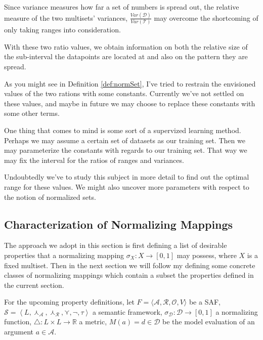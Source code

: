 \documentclass{article}
\newcommand{\real}{\mathbb{R}}  %
\newcommand{\args}{\mathcal{A}} %
\newcommand{\att}{\mathcal{R}}  %
\newcommand{\valueset}{L}
\newcommand{\obj}{\mathcal{O}} %
\newcommand{\safid}{F}               %
\newcommand{\safbodyO}{\langle \args, \att, \obj, V \rangle} %
\newcommand{\safO}{\safid = \safbodyO} %
\newcommand{\sembodyNew}{\left\langle \valueset,\SAFand_\mathcal{A}, \SAFand_\mathcal{R},\SAFor,\lnot,\tau \right\rangle} %
\newcommand{\SAFand}{\curlywedge}     %
\newcommand{\SAFor}{\curlyvee}        %
\newcommand{\sem}{\mathcal{S}}
\newcommand{\dataset}{\mathcal{D}}   %
\newcommand{\ssset}{\mathcal{T}}   %
\begin{document}
Since variance measures how far a set of numbers is spread out, the relative measure of the two multisets' variances, $\frac{Var(\dataset)}{Var(\ssset)}$ may overcome the shortcoming of only taking ranges into consideration. 

With these two ratio values, we obtain information on both the relative size of the sub-interval the datapoints are located at and also on the pattern they are spread. 

As you might see in Definition \ref{def:normSet}, I've tried to restrain the envisioned values of the two rations with some constants. Currently we've not settled on these values, and maybe in future we may choose to replace these constants with some other terms. 

One thing that comes to mind is some sort of a supervized learning method. Perhaps we may assume a certain set of datasets as our training set. Then we may parameterize the constants with regards to our training set. That way we may fix the interval for the ratios of ranges and variances. 

Undoubtedly we've to study this subject in more detail to find out the optimal range for these values. We might also uncover more parameters with respect to the notion of normalized sets. 


\subsection{Characterization of Normalizing Mappings}

The approach we adopt in this section is first defining a list of desirable properties that a normalizing mapping $\sigma_X: X  \rightarrow  [0,1]$ may possess, where $X$ is a fixed multiset.  
Then in the next section we will follow my defining some concrete classes of normalizing mappings which contain a subset the properties defined in the current section.

\vspace{3mm}
For the upcoming property definitions, let $\safO$ be a SAF, $\sem = \sembodyNew$ a semantic framework,  $\sigma_{\dataset}: \dataset  \rightarrow  [0,1]$ a normalizing function,  $\bigtriangleup: \valueset \times \valueset \rightarrow \real$ a metric, $M(a) = d \in \dataset$ be the model evaluation of an argument $a \in \args$.
\end{document}
